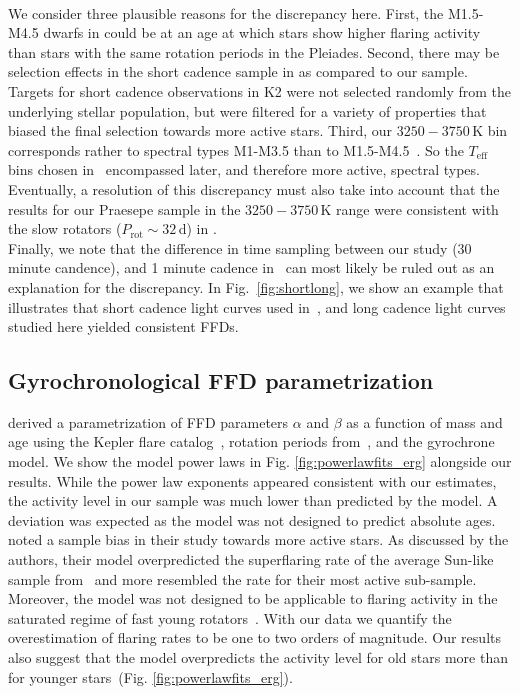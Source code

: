 \documentclass{aa}
\begin{document}
\\
We consider three plausible reasons for the discrepancy here. First, the M1.5-M4.5 dwarfs in \citet{raetz2020} could be at an age at which stars show higher flaring activity than stars with the same rotation periods in the Pleiades. Second, there may be selection effects in the short cadence sample in \citet{raetz2020} as compared to our sample. Targets for short cadence observations in K2 were not selected randomly from the underlying stellar population, but were filtered for a variety of properties that biased the final selection towards more active stars. Third, our $3250-3750\,$K bin corresponds rather to spectral types M1-M3.5 than to M1.5-M4.5~\citep{pecaut_intrinsic_2013}. So the $T_\mathrm{eff}$ bins chosen in~\citet{raetz2020} encompassed later, and therefore more active, spectral types. Eventually, a resolution of this discrepancy must also take into account that the results for our Praesepe sample in the  $3250-3750\,$K range were consistent with the slow rotators ($P_\mathrm{rot}\sim32\,$d) in \citet{raetz2020}.
\\
Finally, we note that the difference in time sampling between our study (30 minute candence), and 1 minute cadence in~\citet{raetz2020} can most likely be ruled out as an explanation for the discrepancy. In Fig.~\ref{fig:shortlong}, we show an example that illustrates that short cadence light curves used in~\citet{raetz2020}, and long cadence light curves studied here yielded consistent FFDs.
\subsection{Gyrochronological FFD parametrization}
\label{sec:davenport}
\citet{davenport2019} derived a parametrization of FFD parameters $\alpha$ and $\beta$ as a function of mass and age using the Kepler flare catalog~\citep{davenport_kepler_2016}, rotation periods from~\citet{mcquillan2014}, and the \citet{mamajek2008} gyrochrone model. We show the model power laws in Fig. \ref{fig:powerlawfits_erg} alongside our results. While the power law exponents appeared consistent with our estimates, the activity level in our sample was much lower than predicted by the model. A deviation was expected as the model was not designed to predict absolute ages. \citet{davenport2019} noted a sample bias in their study towards more active stars. As discussed by the authors, their model overpredicted the superflaring rate of the average Sun-like sample from~\citet{shibayama2013} and more resembled the rate for their most active sub-sample. Moreover, the model was not designed to be applicable to flaring activity in the saturated regime of fast young rotators~\citep{jackman2020}. With our data we quantify the overestimation of flaring rates to be one to two orders of magnitude. Our results also suggest that the model overpredicts the activity level for old stars more than for younger stars~(Fig. \ref{fig:powerlawfits_erg}). 
\end{document}
